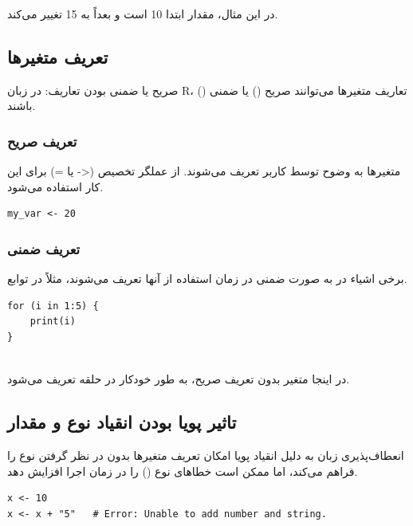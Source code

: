 \documentclass[11pt, a4paper, oneside]{book}
\begin{document}
					در این مثال، مقدار  ابتدا 10 است و بعداً به 15 تغییر می‌کند.

			\subsection{تعریف متغیرها}
				{\large صریح یا ضمنی بودن تعاریف}:
				در زبان R، تعاریف متغیرها می‌توانند صریح () یا ضمنی () باشند.
				
				\subsubsection{تعریف صریح}
				
					متغیرها به وضوح توسط کاربر تعریف می‌شوند.
					از عملگر تخصیص (<- یا =) برای این کار استفاده می‌شود.
						\begin{latin}
							\begin{lstlisting}[caption={\lr{Explicit Variable}}] 
my_var <- 20

							\end{lstlisting}
						\end{latin}
						
				\subsubsection{تعریف ضمنی}
					برخی اشیاء در  به صورت ضمنی در زمان استفاده از آنها تعریف می‌شوند، مثلاً در توابع.
					
						\begin{latin}
							\begin{lstlisting}[caption={\lr{Implicit Variable}}] 
for (i in 1:5) {
	print(i)
}
								
							\end{lstlisting}
						\end{latin}
						
						در اینجا متغیر  بدون تعریف صریح، به طور خودکار در حلقه  تعریف می‌شود.

			\subsection{تاثیر پویا بودن انقیاد نوع و مقدار}
				
				انعطاف‌پذیری زبان  به دلیل انقیاد پویا امکان تعریف متغیرها بدون در نظر گرفتن نوع را فراهم می‌کند، اما ممکن است خطاهای نوع () را در زمان اجرا افزایش دهد.
					\begin{latin}
						\begin{lstlisting}[caption={\lr{Type error}}] 
x <- 10
x <- x + "5"   # Error: Unable to add number and string.

						\end{lstlisting}
					\end{latin}
			
\end{document}
